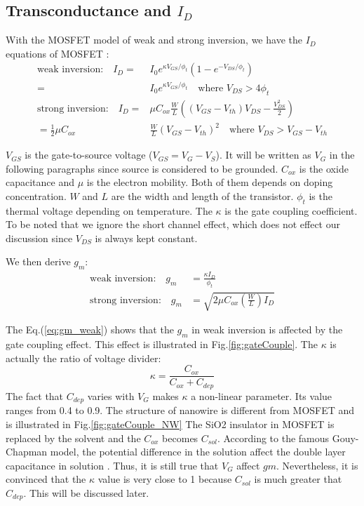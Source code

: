 \subsection{Transconductance and $I_D$} \label{section:IdGm}
With the MOSFET model of weak and strong inversion, we have the $I_D$ equations of MOSFET :
\setlength{\mathindent}{1.5cm}
\begin{align}
    \text{weak inversion:} \quad I_D   = & I_0e^{\kappa V_{GS}/\phi_t}(1 - e^{-V_{DS}/\phi_t})  \label{eq:Ikappa} \\
                                       = & I_0e^{\kappa V_{GS}/\phi_t} \quad \text{where $V_{DS} > 4 \phi_t$ } \\
    \text{strong inversion:} \quad I_D = & \mu C_{ox} \frac{W}{L}((V_{GS} - V_{th})V_{DS} - \frac{V_{DS}^2}{2}) \\
                                       = \frac{1}{2} \mu C_{ox} & \frac{W}{L}(V_{GS} - V_{th})^2 \text{ }\text{ where $V_{DS} > V_{GS} - V_{th}$} \label{eq:ID_Strong}
\end{align}


$V_{GS}$ is the gate-to-source voltage ($V_{GS} = V_G - V_S$).
It will be written as $V_G$ in the following paragraphs since source is considered to be grounded.
$C_{ox}$ is the oxide capacitance and $\mu$ is the electron mobility.
Both of them depends on doping concentration.
$W$ and $L$ are the width and length of the transistor.
$\phi_t$ is the thermal voltage depending on temperature.
The $\kappa$ is the gate coupling coefficient.
To be noted that we ignore the short channel effect, which does not effect our discussion since $V_{DS}$ is always kept constant.

We then derive $g_m$:
\begin{align}
    \text{weak inversion:} \quad g_m & = \frac{\kappa I_D}{\phi_t} \label{eq:gm_weak} \\
    \text{strong inversion:} \quad g_m & = \sqrt{2 \mu C_{ox} (\frac{W}{L})I_{D}} \label{eq:gm_strong}
\end{align}

The Eq.(\ref{eq:gm_weak}) shows that the $g_m$ in weak inversion is affected by the gate coupling effect.
This effect is illustrated in Fig.\ref{fig:gateCouple}.
The $\kappa$ is actually the ratio of voltage divider:
\begin{equation}
    \kappa = \frac{C_{ox}}{C_{ox} + C_{dep}}
\end{equation}
The fact that $C_{dep}$ varies with $V_G$ makes $\kappa$ a non-linear parameter.
Its value ranges from 0.4 to 0.9.
The structure of nanowire is different from MOSFET and is illustrated in Fig.\ref{fig:gateCouple_NW}
The SiO2 insulator in MOSFET is replaced by the solvent and the $C_{ox}$ becomes $C_{sol}$.
According to the famous Gouy-Chapman model, the potential difference in the solution affect the double layer capacitance in solution \cite{ElecChem}.
Thus, it is still true that $V_G$ affect $gm$.
Nevertheless, it is convinced that the $\kappa$ value is very close to 1 because $C_{sol}$ is much greater that $C_{dep}$.
This will be discussed later.

